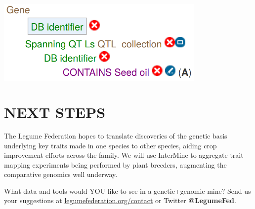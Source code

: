 \documentclass[]{pagposter}
\begin{document}
\begin{multicols*}{3}
\begin{center}
{    }
    \vspace{24pt}
    \includegraphics[width=4in]{gene-seed-oil-query.png} %
  \end{center}


  \section*{NEXT STEPS}

  The Legume Federation hopes to translate discoveries of the genetic basis underlying key traits made in one species 
  to other species, aiding crop improvement efforts across the family.
  We will use InterMine to aggregate trait mapping experiments being performed by plant breeders, augmenting the comparative genomics well underway.

  What data and tools would YOU like to see in a genetic+genomic mine?
  Send us your suggestions at \url{legumefederation.org/contact} or Twitter \textbf{@LegumeFed}.





\end{multicols*}
\end{document}
